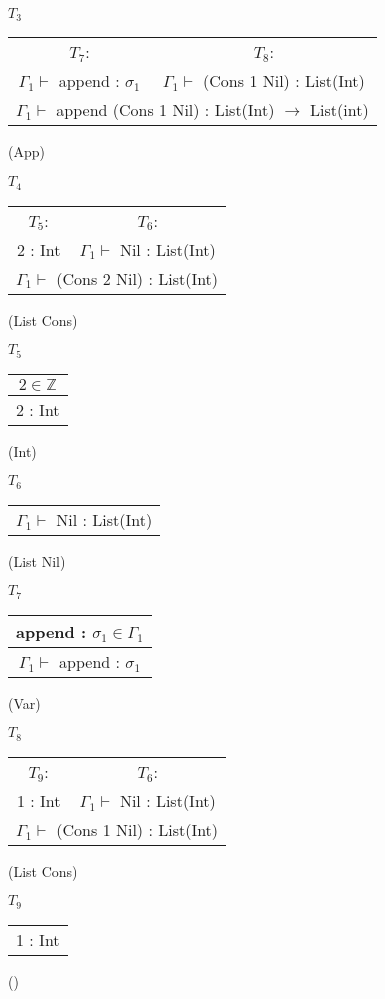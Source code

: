 \documentclass[12pt, a4paper]{article}
\begin{document}
\begin{enumerate}[(a)]
	$T_3$
	\begin{tabular}{c c}
		$T_7$: & $T_8$:\\
		$\Gamma_1 \vdash$ append : $\sigma_1$ & $\Gamma_1 \vdash$ (Cons 1 Nil) : List(Int)
		\\\hline
		\multicolumn{2}{c}{$\Gamma_1 \vdash$ append (Cons 1 Nil) : List(Int) $\rightarrow$ List(int)}
	\end{tabular}
	(App)

	$T_4$
	\begin{tabular}{c c}
		$T_5$: & $T_6$:\\
		2 : Int & $\Gamma_1 \vdash$ Nil : List(Int)
		\\\hline
		\multicolumn{2}{c}{$\Gamma_1 \vdash$ (Cons 2 Nil) : List(Int)}
	\end{tabular}
	(List Cons)

	$T_5$
	\begin{tabular}{c}
		$2 \in \mathbb{Z}$
		\\\hline
		2 : Int
	\end{tabular}
	(Int)

	$T_6$
	\begin{tabular}{c}
		\\\hline
		$\Gamma_1 \vdash$ Nil : List(Int)
	\end{tabular}
	(List Nil)

	$T_7$
	\begin{tabular}{c}
		append : $\sigma_1 \in \Gamma_1$
		\\\hline
		$\Gamma_1 \vdash$ append : $\sigma_1$
	\end{tabular}
	(Var)

	$T_8$
	\begin{tabular}{c c}
		$T_9$: &$T_6$:\\
		1 : Int & $\Gamma_1 \vdash$ Nil : List(Int)
		\\\hline
		\multicolumn{2}{c}{$\Gamma_1 \vdash$ (Cons 1 Nil) : List(Int)}
	\end{tabular}
	(List Cons)

	$T_9$
	\begin{tabular}{c}
		\\\hline
		1 : Int
	\end{tabular}
	()
\end{enumerate}

\section{} %
\end{document}
